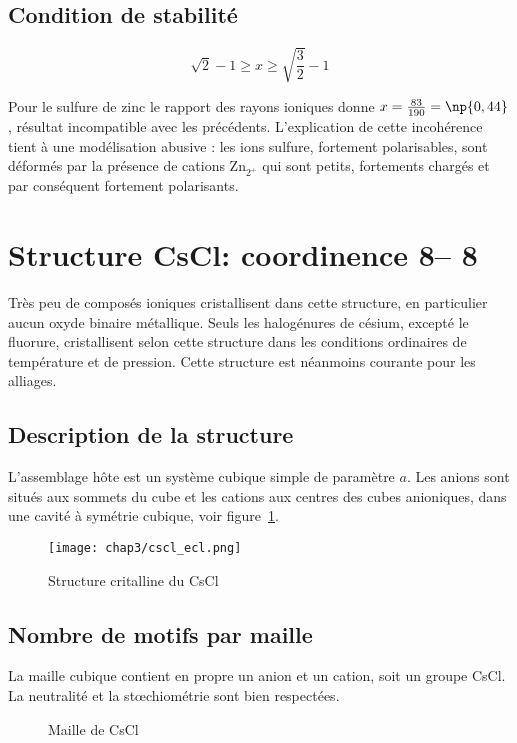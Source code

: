\subsection{Condition de stabilité}
\begin{equation}
    \sqrt{2} - 1 \geq x \geq \sqrt{\frac{3}{2}} - 1
    \label{eq:3_zns_stab}
\end{equation}
\begin{rem}
    Pour le sulfure de zinc le rapport des rayons ioniques donne
    $x = \frac{83}{190} = \np{0,44}$, résultat incompatible avec les précédents.
    L'explication de cette incohérence tient à une
    modélisation abusive : les ions sulfure, fortement polarisables, sont déformés 
    par la présence de cations Zn$_{2^+}$ qui sont petits, fortements chargés et 
    par conséquent fortement polarisants.
\end{rem}



\section{Structure CsCl: coordinence 8\--- 8}
Très peu de composés ioniques cristallisent dans cette structure, en particulier 
aucun oxyde binaire métallique. Seuls les halogénures de césium, excepté le fluorure,
cristallisent selon cette structure dans les conditions ordinaires de température et de
pression. Cette structure est néanmoins courante pour les alliages.


\subsection{Description de la structure}
L'assemblage hôte est un système cubique simple de paramètre $a$. Les anions sont
situés aux sommets du cube et les cations aux centres des cubes anioniques, dans une
cavité à symétrie cubique, voir figure~\ref{fig:3_cscl_struct}.
\begin{figure}
    \centering
    \texttt{[image: chap3/cscl\_ecl.png]}
    \caption{Structure critalline du CsCl}\label{fig:3_cscl_struct}
\end{figure}


\subsection{Nombre de motifs par maille}
La maille cubique contient en propre un anion et un cation, soit un groupe CsCl.
La neutralité et la st\oe chiométrie sont bien respectées.
\begin{figure}
    \centering
    \qquad
    \qquad
    \caption{Maille de CsCl}\label{fig:3_cscl_maille}
\end{figure}


